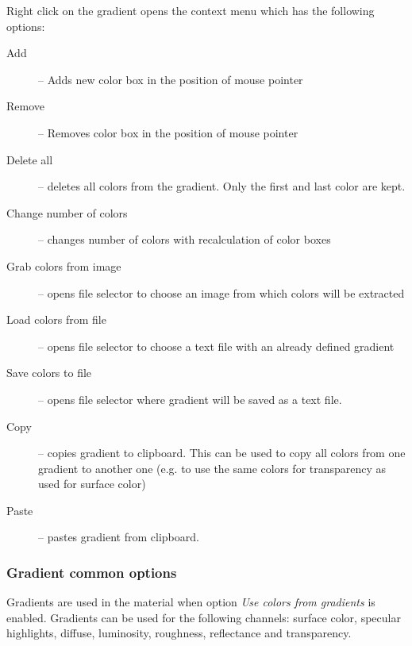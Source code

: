 Right click on the gradient opens the context menu which has the following options:
\nopagebreak
\begin{description}
	\item[Add] -- Adds new color box in the position of mouse pointer
	\item[Remove] -- Removes color box in the position of mouse pointer
	\item[Delete all] -- deletes all colors from the gradient. Only the first and last color are kept.
	\item[Change number of colors] -- changes number of colors with recalculation of color boxes
	\item[Grab colors from image] -- opens file selector to choose an image from which colors will be extracted
	\item[Load colors from file] -- opens file selector to choose a text file with an already defined gradient
	\item[Save colors to file] -- opens file selector where gradient will be saved as a text file.
	\item[Copy] -- copies gradient to clipboard. This can be used to copy all colors from one gradient to another one (e.g. to use the same colors for transparency as used for surface color)
	\item[Paste] -- pastes gradient from clipboard. 
\end{description}

\subsubsection{Gradient common options}\label{materials-gradient-common-options}

Gradients are used in the material when option \emph{Use colors from gradients} is enabled. Gradients can be used for the following channels: surface color, specular highlights, diffuse, luminosity, roughness, reflectance and transparency.

